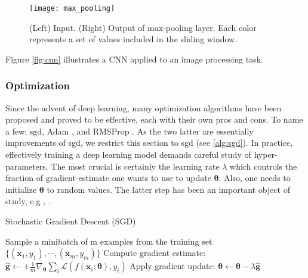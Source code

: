 \begin{figure}[!htpb]
  \centering
  \texttt{[image: max\_pooling]}
  \caption{(Left) Input. (Right) Output of max-pooling layer. Each color represents a set of values included in the sliding window.}
  \label{fig:max_pool}
\end{figure}
Figure \ref{fig:cnn} illustrates a CNN applied to an image processing task.

\subsubsection{Optimization}
Since the advent of deep learning, many optimization algorithms have been proposed and proved to be effective, each with their own pros and cons.
To name a few: \gls{sgd}, Adam \cite{kingma14}, and RMSProp \cite{tieleman12}.
As the two latter are essentially improvements of \gls{sgd}, we restrict this section to \gls{sgd} (see \ref{alg:sgd}).
In practice, effectively training a deep learning model demands careful study of hyper-parameters.
The most crucial is certainly the learning rate $\lambda$ which controls the fraction of gradient-estimate one wants to use to update $\bm{\theta}$.
Also, one needs to initialize $\bm{\theta}$ to random values.
The latter step has been an important object of study, e.g \cite{he15}, \cite{glorot10}.

\begin{algorithm}[H]
  \label{alg:sgd}
 \caption{Stochastic Gradient Descent (SGD)}

 \begin{algorithmic}[1]
  \Repeat
    \State Sample a minibatch of m examples from the training set $\{(\bm{x}_{1},y_{1}), \cdots, (\bm{x}_{m},y_{m})\}$
    \State Compute gradient estimate: $\hat{\bm{g}} \leftarrow + \frac{1}{m} \nabla_{\bm{\theta}}\sum_{i}\mathcal{L}(f(\bm{x}_{i}; \bm{\theta}), y_{i})$
    \State Apply gradient update: $\bm{\theta} \leftarrow \bm{\theta} - \lambda \hat{\bm{g}}$
  \end{algorithmic}
\end{algorithm}


